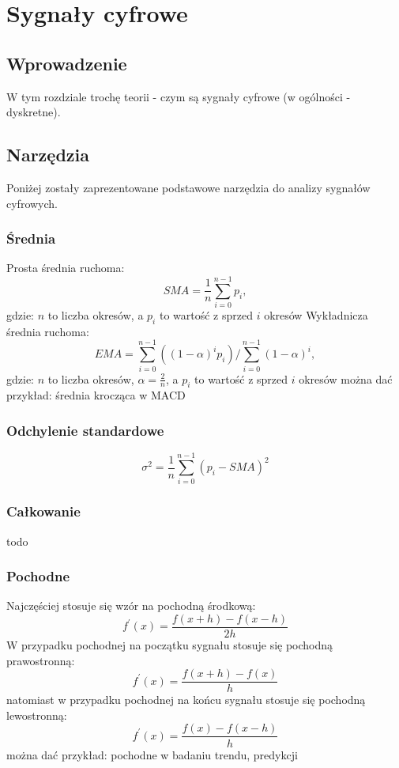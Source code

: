 \chapter{Sygnały cyfrowe}
\section{Wprowadzenie}
W tym rozdziale trochę teorii - czym są sygnały cyfrowe (w ogólności - dyskretne). 


\section{Narzędzia}
Poniżej zostały zaprezentowane podstawowe narzędzia do analizy sygnałów cyfrowych.
\subsection{Średnia}
Prosta średnia ruchoma:
\begin{equation}
SMA = \frac{1}{n}\sum_{i = 0}^{n - 1}p_i,
\end{equation}
gdzie: $n$ to liczba okresów, a $p_i$ to wartość z sprzed $i$ okresów
Wykładnicza średnia ruchoma:
\begin{equation}
EMA = \sum_{i = 0}^{n - 1}((1 - \alpha)^ip_i) / \sum_{i = 0}^{n-1}(1 - \alpha)^i,
\end{equation}
gdzie: $n$ to liczba okresów, $\alpha = \frac{2}{n}$, a $p_i$ to wartość z sprzed $i$ okresów
można dać przykład: średnia krocząca w MACD
\subsection{Odchylenie standardowe}
\begin{equation}
\sigma^2 = \frac{1}{n}\sum_{i = 0}^{n - 1}(p_i - SMA)^2
\end{equation}
\subsection{Całkowanie}
todo
\subsection{Pochodne}
Najczęściej stosuje się wzór na pochodną środkową:
\begin{equation}
f^\prime(x) = \frac{f(x + h) - f(x - h)}{2h}
\end{equation}
W przypadku pochodnej na początku sygnału stosuje się pochodną prawostronną:
\begin{equation}
f^\prime(x) = \frac{f(x + h) - f(x)}{h}
\end{equation}
natomiast w przypadku pochodnej na końcu sygnału stosuje się pochodną lewostronną:
\begin{equation}
f^\prime(x) = \frac{f(x) - f(x - h)}{h}
\end{equation}
można dać przykład: pochodne w badaniu trendu, predykcji


